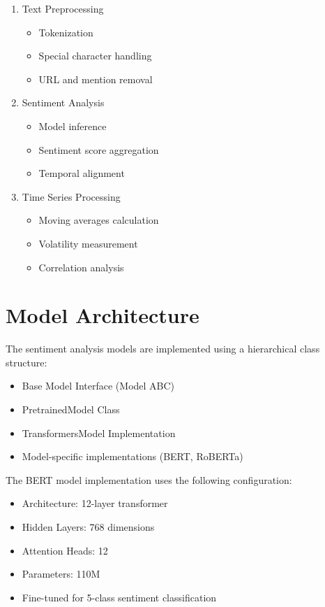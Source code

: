 \documentclass[12pt,a4paper]{report}
\begin{document}
\begin{enumerate}
    \item Text Preprocessing
          \begin{itemize}
              \item Tokenization
              \item Special character handling
              \item URL and mention removal
          \end{itemize}

    \item Sentiment Analysis
          \begin{itemize}
              \item Model inference
              \item Sentiment score aggregation
              \item Temporal alignment
          \end{itemize}

    \item Time Series Processing
          \begin{itemize}
              \item Moving averages calculation
              \item Volatility measurement
              \item Correlation analysis
          \end{itemize}
\end{enumerate}

\section{Model Architecture}
The sentiment analysis models are implemented using a hierarchical class
structure:

\begin{itemize}
    \item Base Model Interface (Model ABC)
    \item PretrainedModel Class
    \item TransformersModel Implementation
    \item Model-specific implementations (BERT, RoBERTa)
\end{itemize}

The BERT model implementation uses the following configuration:

\begin{itemize}
    \item Architecture: 12-layer transformer
    \item Hidden Layers: 768 dimensions
    \item Attention Heads: 12
    \item Parameters: 110M
    \item Fine-tuned for 5-class sentiment classification
\end{itemize}
\end{document}

